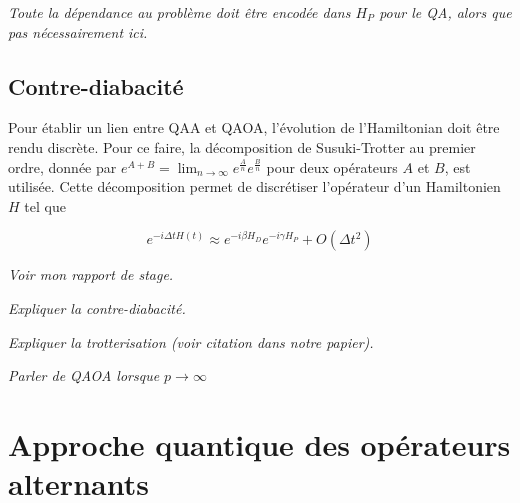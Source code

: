 \textcolor{mydarkred}{\textit{Toute la dépendance au problème doit être encodée dans $H_P$ pour le QA, alors que pas nécessairement ici.}}


\subsection{Contre-diabacité}

Pour établir un lien entre QAA et QAOA, l'évolution de l'Hamiltonian doit être rendu discrète. Pour ce faire, la décomposition de Susuki-Trotter au premier ordre, donnée par $e^{A+B} = \lim_{n \to \infty} e^{\frac{A}{n}} e^{\frac{B}{n}}$ pour deux opérateurs $A$ et $B$, est utilisée. Cette décomposition permet de discrétiser l'opérateur d'un Hamiltonien $H$ tel que

\begin{equation}
    e^{-i\Delta t H(t)} \approx e^{-i \beta H_D} e^{-i \gamma H_P} + O(\Delta t^2)
\end{equation}

\textcolor{mydarkred}{\textit{Voir mon rapport de stage.}}

\textcolor{mydarkred}{\textit{Expliquer la contre-diabacité.}}

\textcolor{mydarkred}{\textit{Expliquer la trotterisation (voir citation dans notre papier).}}

\textcolor{mydarkred}{\textit{Parler de QAOA lorsque $p \to \infty$}}



\section{Approche quantique des opérateurs alternants}

